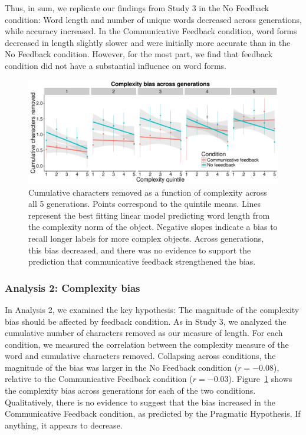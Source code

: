 Thus, in sum, we replicate our findings from Study 3 in the No Feedback condition: Word length and number of unique words decreased across generations, while accuracy increased. In the Communicative Feedback condition, word forms decreased in length slightly slower and were initially more accurate than in the No Feedback condition. However, for the most part, we find that feedback condition did not have a substantial influence on word forms.

\begin{figure}[t!]
\begin{center}
\includegraphics[scale = .5]{figs/chap4_4bias.pdf}
\end{center}
\caption{Cumulative characters removed as a function of complexity across all 5 generations. Points correspond to the quintile means. Lines represent the best fitting linear model predicting word length from the complexity norm of the object. Negative slopes indicate a bias to recall longer labels for  more complex objects. Across generations, this bias decreased, and there was no evidence to support the prediction that communicative feedback strengthened the bias.}
\label{fig:cbias4}
\end{figure}


\subsubsection{Analysis 2: Complexity bias}
In Analysis 2, we examined the key hypothesis: The magnitude of the complexity bias should be affected by feedback condition. As in Study 3, we analyzed the cumulative number of characters removed as our measure of length. For each condition, we measured the correlation between the complexity measure of the word and cumulative characters removed. Collapsing across conditions, the magnitude of the bias was larger in the No Feedback condition ($r = -0.08$), relative to the Communicative Feedback condition  ($r = -0.03$).  Figure\ \ref{fig:cbias4} shows the complexity bias across generations for each of the two conditions. Qualitatively, there is no evidence to suggest that the bias increased in the Communicative Feedback condition, as predicted by the Pragmatic Hypothesis. If anything, it appears to decrease. 

